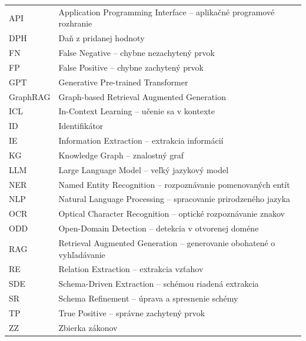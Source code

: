 \noindent
\begin{tabular}{@{}p{2.8cm}p{12cm}@{}}
API & Application Programming Interface -- aplikačné programové rozhranie \\
DPH & Daň z pridanej hodnoty \\
FN & False Negative -- chybne nezachytený prvok \\
FP & False Positive -- chybne zachytený prvok \\
GPT & Generative Pre-trained Transformer \\
GraphRAG & Graph-based Retrieval Augmented Generation \\
ICL & In-Context Learning -- učenie sa v kontexte \\
ID & Identifikátor \\
IE & Information Extraction -- extrakcia informácií \\
KG & Knowledge Graph -- znalostný graf \\
LLM & Large Language Model -- veľký jazykový model \\
NER & Named Entity Recognition -- rozpoznávanie pomenovaných entít \\
NLP & Natural Language Processing -- spracovanie prirodzeného jazyka \\
OCR & Optical Character Recognition -- optické rozpoznávanie znakov \\
ODD & Open-Domain Detection -- detekcia v otvorenej doméne \\
RAG & Retrieval Augmented Generation -- generovanie obohatené o vyhľadávanie \\
RE & Relation Extraction -- extrakcia vzťahov \\
SDE & Schema-Driven Extraction -- schémou riadená extrakcia \\
SR & Schema Refinement -- úprava a spresnenie schémy \\
TP & True Positive -- správne zachytený prvok \\
ZZ & Zbierka zákonov \\
\end{tabular}
